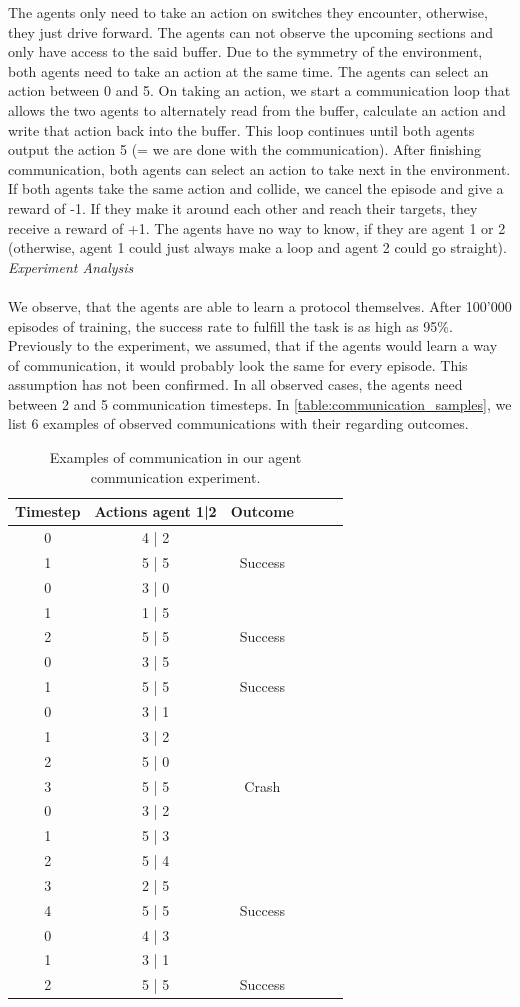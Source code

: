 The agents only need to take an action on switches they encounter, otherwise, they just drive forward. The agents can not observe the upcoming sections and only have access to the said buffer. Due to the symmetry of the environment, both agents need to take an action at the same time. The agents can select an action between 0 and 5. On taking an action, we start a communication loop that allows the two agents to alternately read from the buffer, calculate an action and write that action back into the buffer. This loop continues until both agents output the action 5 (= we are done with the communication). After finishing communication, both agents can select an action to take next in the environment. If both agents take the same action and collide, we cancel the episode and give a reward of -1. If they make it around each other and reach their targets, they receive a reward of +1. The agents have no way to know, if they are agent 1 or 2 (otherwise, agent 1 could just always make a loop and agent 2 could go straight).\newpage
\textit{Experiment Analysis}\\\\
We observe, that the agents are able to learn a protocol themselves. After 100'000 episodes of training, the success rate to fulfill the task is as high as 95\%. Previously to the experiment, we assumed, that if the agents would learn a way of communication, it would probably look the same for every episode. This assumption has not been confirmed. In all observed cases, the agents need between 2 and 5 communication timesteps. In \autoref{table:communication_samples}, we list 6 examples of observed communications with their regarding outcomes.
\begin{table}[H]
	\centering
	\begin{tabular}{ |c|c|c|c|c|c| }
		\hline
		\textbf{Timestep}
		& \textbf{Actions agent 1|2}
		& \textbf{Outcome}\\
		\hline
		0 & 4 | 2 &\\
		1 & 5 | 5 & Success\\
		\hline
		0 & 3 | 0 &\\
		1 & 1 | 5 &\\
		2 & 5 | 5 & Success\\
		\hline
		0 & 3 | 5 &\\
		1 & 5 | 5 & Success\\
		\hline
		0 & 3 | 1 &\\
		1 & 3 | 2 &\\
		2 & 5 | 0 &\\
		3 & 5 | 5 & Crash\\
		\hline
		0 & 3 | 2 &\\
		1 & 5 | 3 &\\
		2 & 5 | 4 &\\
		3 & 2 | 5 &\\
		4 & 5 | 5 & Success\\
		\hline
		0 & 4 | 3 &\\
		1 & 3 | 1 &\\
		2 & 5 | 5 & Success\\
		\hline
	\end{tabular}
	\caption{Examples of communication in our agent communication experiment.}
	\label{table:communication_samples}
\end{table}
